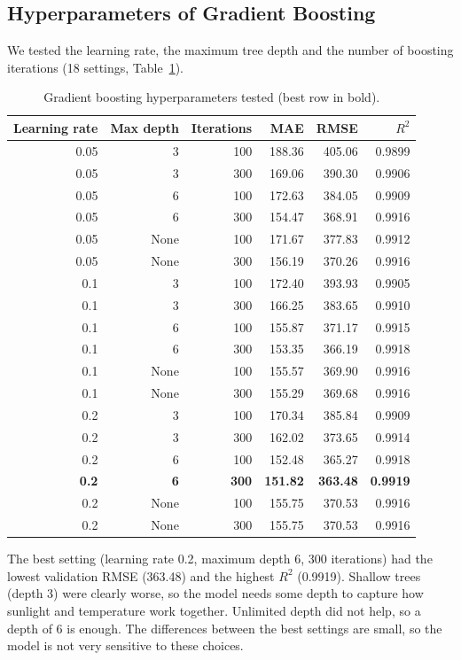 \documentclass[11pt,a4paper]{article}
\begin{document}
\subsection{Hyperparameters of Gradient Boosting}
We tested the learning rate, the maximum tree depth and the number of
boosting iterations (18 settings, Table~\ref{tab:tuning}).

\begin{table}[H]
\centering
\caption{Gradient boosting hyperparameters tested (best row in bold).}
\label{tab:tuning}
\begin{tabular}{rrrrrr}
\toprule
Learning rate & Max depth & Iterations & MAE & RMSE & $R^2$ \\
\midrule
0.05 & 3 & 100 & 188.36 & 405.06 & 0.9899 \\
0.05 & 3 & 300 & 169.06 & 390.30 & 0.9906 \\
0.05 & 6 & 100 & 172.63 & 384.05 & 0.9909 \\
0.05 & 6 & 300 & 154.47 & 368.91 & 0.9916 \\
0.05 & None & 100 & 171.67 & 377.83 & 0.9912 \\
0.05 & None & 300 & 156.19 & 370.26 & 0.9916 \\
0.1 & 3 & 100 & 172.40 & 393.93 & 0.9905 \\
0.1 & 3 & 300 & 166.25 & 383.65 & 0.9910 \\
0.1 & 6 & 100 & 155.87 & 371.17 & 0.9915 \\
0.1 & 6 & 300 & 153.35 & 366.19 & 0.9918 \\
0.1 & None & 100 & 155.57 & 369.90 & 0.9916 \\
0.1 & None & 300 & 155.29 & 369.68 & 0.9916 \\
0.2 & 3 & 100 & 170.34 & 385.84 & 0.9909 \\
0.2 & 3 & 300 & 162.02 & 373.65 & 0.9914 \\
0.2 & 6 & 100 & 152.48 & 365.27 & 0.9918 \\
\textbf{0.2} & \textbf{6} & \textbf{300} & \textbf{151.82} & \textbf{363.48} & \textbf{0.9919} \\
0.2 & None & 100 & 155.75 & 370.53 & 0.9916 \\
0.2 & None & 300 & 155.75 & 370.53 & 0.9916 \\
\bottomrule
\end{tabular}
\end{table}

The best setting (learning rate 0.2, maximum depth 6, 300 iterations) had
the lowest validation RMSE (363.48) and the highest $R^2$ (0.9919). Shallow
trees (depth 3) were clearly worse, so the model needs some depth to capture
how sunlight and temperature work together. Unlimited depth did not help, so
a depth of 6 is enough. The differences between the best settings are small,
so the model is not very sensitive to these choices.
\end{document}
